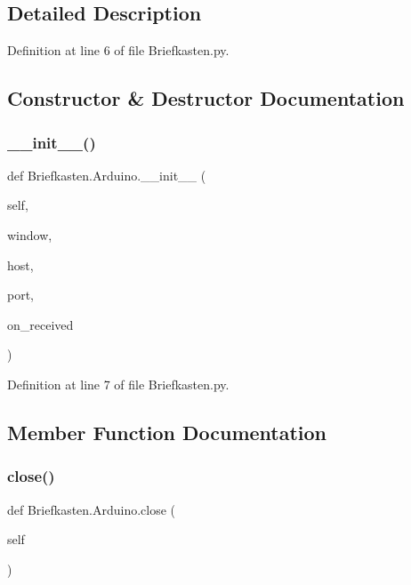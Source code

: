 \subsection{Detailed Description}


Definition at line 6 of file Briefkasten.\+py.



\subsection{Constructor \& Destructor Documentation}
\mbox{\label{class_briefkasten_1_1_arduino_a1a4acf66e303bcedd768975f12ac8413}} 
\subsubsection{\texorpdfstring{\+\_\+\+\_\+init\+\_\+\+\_\+()}{\_\_init\_\_()}}
{\footnotesize\ttfamily def Briefkasten.\+Arduino.\+\_\+\+\_\+init\+\_\+\+\_\+ (\begin{DoxyParamCaption}\item[{}]{self,  }\item[{}]{window,  }\item[{}]{host,  }\item[{}]{port,  }\item[{}]{on\+\_\+received }\end{DoxyParamCaption})}



Definition at line 7 of file Briefkasten.\+py.



\subsection{Member Function Documentation}
\mbox{\label{class_briefkasten_1_1_arduino_a1091947726bebecead5bd7cff230cd3a}} 
\subsubsection{\texorpdfstring{close()}{close()}}
{\footnotesize\ttfamily def Briefkasten.\+Arduino.\+close (\begin{DoxyParamCaption}\item[{}]{self }\end{DoxyParamCaption})}


